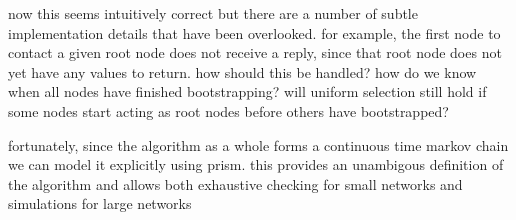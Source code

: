 \documentclass[a4paper,10pt]{article}
\begin{document}
now this seems intuitively correct but there are a number of subtle implementation details that have been overlooked. for example, the first node to contact a given root node does not receive a reply, since that root node does not yet have any values to return. how should this be handled? how do we know when all nodes have finished bootstrapping? will uniform selection still hold if some nodes start acting as root nodes before others have bootstrapped?

fortunately, since the algorithm as a whole forms a continuous time markov chain we can model it explicitly using prism. this provides an unambigous definition of the algorithm and allows both exhaustive checking for small networks and simulations for large networks
\end{document}
